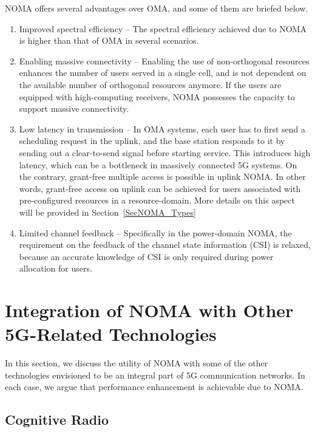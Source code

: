 \begin{multicols}{2}
NOMA offers several advantages over OMA, and some of them are briefed below.
\begin{enumerate}
 \item Improved spectral efficiency -- The spectral efficiency achieved due to NOMA is higher than that of OMA in several scenarios.
 \item Enabling massive connectivity -- Enabling the use of non-orthogonal resources enhances the number of users served in a single cell, and is not dependent on the available number of orthogonal resources anymore. If the users are equipped with high-computing receivers, NOMA possesses the capacity to support massive connectivity.
 \item Low latency in transmission -- In OMA systems, each user has to first send a scheduling request in the uplink, and the base station responds to it by sending out a clear-to-send signal before starting service. This introduces high latency, which can be a bottleneck in massively connected 5G systems. On the contrary, grant-free multiple access is possible in uplink NOMA. In other words, grant-free access on uplink can be achieved for users associated with pre-configured resources in a resource-domain. More details on this aspect will be provided in Section~\ref{SecNOMA_Types}
 \item Limited channel feedback -- Specifically in the power-domain NOMA, the requirement on the feedback of the channel state information (CSI) is relaxed, because an accurate knowledge of CSI is only required during power allocation for users. 
\end{enumerate}

\section{Integration of NOMA with Other\\5G-Related Technologies}
In this section, we discuss the utility of NOMA with some of the other technologies envisioned to be an integral part of 5G communication networks. In each case, we argue that performance enhancement is achievable due to NOMA.

\subsection{Cognitive Radio}


\end{multicols}
